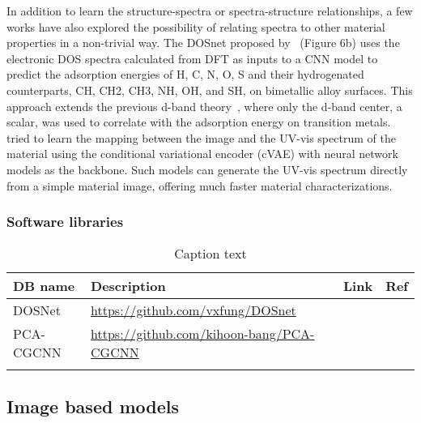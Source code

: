 \documentclass[pdflatex,sn-mathphys]{sn-jnl}%
\theoremstyle{thmstyleone}%
\theoremstyle{thmstyletwo}%
\theoremstyle{thmstylethree}%
\begin{document}
In addition to learn the structure-spectra or spectra-structure relationships, a few works have also explored the possibility of relating spectra to other material properties in a non-trivial way. The DOSnet proposed by~\cite{Fung.33} (Figure 6b) uses the electronic DOS spectra calculated from DFT as inputs to a CNN model to predict the adsorption energies of H, C, N, O, S and their hydrogenated counterparts, CH, CH2, CH3, NH, OH, and SH,  on bimetallic alloy surfaces. This approach extends the previous d-band theory~\cite{34}, where only the d-band center, a scalar, was used to correlate with the adsorption energy on transition metals. \cite{Stein.35} tried to learn the mapping between the image and the UV-vis spectrum of the material using the conditional variational encoder (cVAE) with neural network models as the backbone. Such models can generate the UV-vis spectrum directly from a simple material image, offering much faster material characterizations.

\subsubsection{Software libraries }
\begin{table}[h]

\begin{minipage}{174pt}
\caption{Caption text}\label{tab:spectral-data}%
\begin{tabular}{@{}llll@{}}
\toprule
DB name & Description & Link  & Ref\\
\midrule
DOSNet   &  \url{https://github.com/vxfung/DOSnet}   & \cite{fung2021machine}  \\
PCA-CGCNN   &  \url{https://github.com/kihoon-bang/PCA-CGCNN}   & \cite{bang2021accelerated}  \\


\botrule
\end{tabular}
\end{minipage}
\end{table}

\subsection{Image based models}\label{sec:image}
\end{document}

